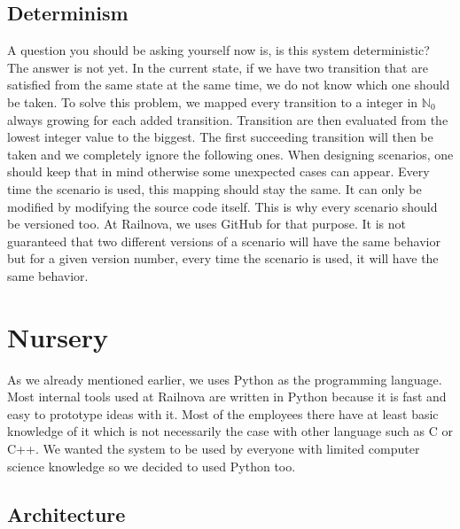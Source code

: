 \documentclass[12pt]{article}
\theoremstyle{definition}
\theoremstyle{definition}
\theoremstyle{remark}
\begin{document}
\subsection{Determinism}

A question you should be asking yourself now is, is this system deterministic? The answer is not yet. In the current state, if we have two transition that are satisfied from the same state at the same time, we do not know which one should be taken. To solve this problem, we mapped every transition to a integer in $\mathbb{N}_0$ always growing for each added transition. Transition are then evaluated from the lowest integer value to the biggest. The first succeeding transition will then be taken and we completely ignore the following ones. When designing scenarios, one should keep that in mind otherwise some unexpected cases can appear. Every time the scenario is used, this mapping should stay the same. It can only be modified by modifying the source code itself. This is why every scenario should be versioned too. At Railnova, we uses GitHub for that purpose. It is not guaranteed that two different versions of a scenario will have the same behavior but for a given version number, every time the scenario is used, it will have the same behavior.



\section{Nursery}


As we already mentioned earlier, we uses Python as the programming language. Most internal tools used at Railnova are written in Python because it is fast and easy to prototype ideas with it. Most of the employees there have at least basic knowledge of it which is not necessarily the case with other language such as C or C++. We wanted the system to be used by everyone with limited computer science knowledge so we decided to used Python too.


\subsection{Architecture}
\end{document}
